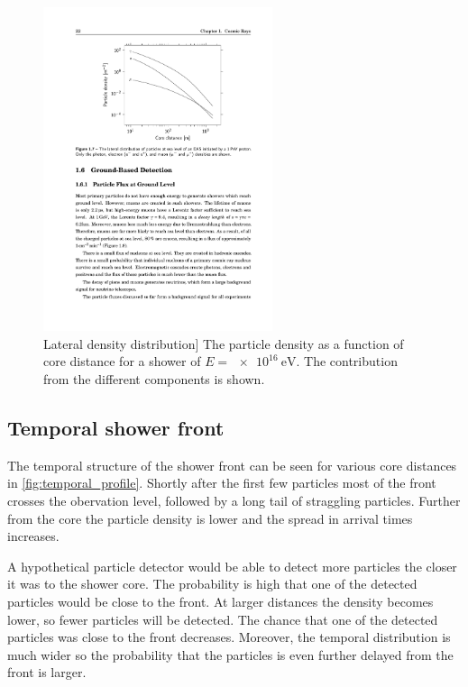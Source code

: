 \begin{figure}
    \centering
    \includegraphics[width=0.6\textwidth]
                    {plots/cosmic-rays/ldf}
    \caption{Lateral density distribution]
The particle density as a function of core distance for a shower of $E = \SI{e16}{\eV}$. The contribution from the different components is shown.}
    \label{fig:ldf}
\end{figure}


\subsection{Temporal shower front}

The temporal structure of the shower front can be seen for various core distances in \cref{fig:temporal_profile}. Shortly after the first few particles most of the front crosses the obervation level, followed by a long tail of straggling particles. Further from the core the particle density is lower and the spread in arrival times increases.

A hypothetical particle detector would be able to detect more particles the closer it was to the shower core. The probability is high that one of the detected particles would be close to the front. At larger distances the density becomes lower, so fewer particles will be detected. The chance that one of the detected particles was close to the front decreases. Moreover, the temporal distribution is much wider so the probability that the particles is even further delayed from the front is larger.

